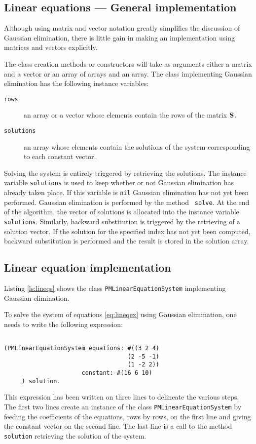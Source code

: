 \documentclass[twoside]{book}
\begin{document}
\subsection{Linear equations --- General implementation}
 Although using matrix and vector
notation greatly simplifies the discussion of Gaussian
elimination, there is little gain in making an implementation
using matrices and vectors explicitly.

The class creation methods or constructors will take as arguments
either a matrix and a vector or an array of arrays and an array.
The class implementing Gaussian elimination has the following
instance variables:
\begin{description}
  \item[\texttt{rows}] an array or a vector whose elements contain the rows of the
  matrix ${\bf S}$.
  \item[\tt solutions] an array whose elements contain the solutions of the
  system corresponding to each constant vector.
\end{description}

Solving the system is entirely triggered by retrieving the
solutions. The instance variable {\tt solutions} is used to keep
whether or not Gaussian elimination has already taken place. If
this variable is {\tt nil} Gaussian elimination has not yet been
performed. Gaussian elimination is performed by the method {\tt
solve}. At the end of the algorithm, the vector of solutions is
allocated into the instance variable {\tt solutions}. Similarly,
backward substitution is triggered by the retrieving of a solution
vector. If the solution for the specified index has not yet been
computed, backward substitution is performed and the result is
stored in the solution array.

\subsection{Linear equation implementation}
Listing \ref{ls:lineqs} shows the class {\tt PMLinearEquationSystem} implementing Gaussian elimination.

To solve the system of equations \ref{eq:lineqex} using Gaussian elimination, one needs to write the following expression:
\begin{codeExample}
\begin{verbatim}

(PMLinearEquationSystem equations: #((3 2 4)
                                   (2 -5 -1)
                                   (1 -2 2))
                      constant: #(16 6 10)
     ) solution.
\end{verbatim}
\end{codeExample}
This expression has been written on three lines to delineate the
various steps. The first two lines create an instance of the class
{\tt PMLinearEquationSystem} by feeding the coefficients of the
equations, rows by rows, on the first line and giving the constant
vector on the second line. The last line is a call to the method
{\tt solution} retrieving the solution of the system.
\end{document}
